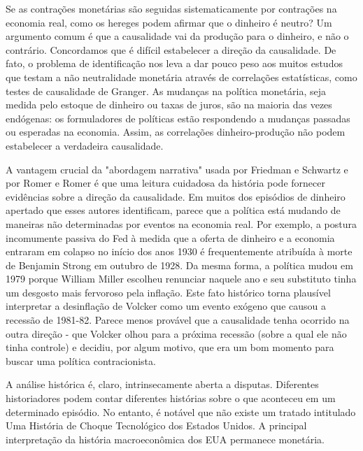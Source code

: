 \documentclass[a4paper,12pt]{article}[abntex2]
\begin{document}
Se as contrações monetárias são seguidas sistematicamente por contrações na economia real, como os hereges podem afirmar que o dinheiro é neutro? Um argumento comum é que a causalidade vai da produção para o dinheiro, e não o contrário. Concordamos que é difícil estabelecer a direção da causalidade. De fato, o problema de identificação nos leva a dar pouco peso aos muitos estudos que testam a não neutralidade monetária através de correlações estatísticas, como testes de causalidade de Granger. As mudanças na política monetária, seja medida pelo estoque de dinheiro ou taxas de juros, são na maioria das vezes endógenas: os formuladores de políticas estão respondendo a mudanças passadas ou esperadas na economia. Assim, as correlações dinheiro-produção não podem estabelecer a verdadeira causalidade.

A vantagem crucial da "abordagem narrativa" usada por Friedman e Schwartz e por Romer e Romer é que uma leitura cuidadosa da história pode fornecer evidências sobre a direção da causalidade. Em muitos dos episódios de dinheiro apertado que esses autores identificam, parece que a política está mudando de maneiras não determinadas por eventos na economia real. Por exemplo, a postura incomumente passiva do Fed à medida que a oferta de dinheiro e a economia entraram em colapso no início dos anos 1930 é frequentemente atribuída à morte de Benjamin Strong em outubro de 1928. Da mesma forma, a política mudou em 1979 porque William Miller escolheu renunciar naquele ano e seu substituto tinha um desgosto mais fervoroso pela inflação. Este fato histórico torna plausível interpretar a desinflação de Volcker como um evento exógeno que causou a recessão de 1981-82. Parece menos provável que a causalidade tenha ocorrido na outra direção - que Volcker olhou para a próxima recessão (sobre a qual ele não tinha controle) e decidiu, por algum motivo, que era um bom momento para buscar uma política contracionista.

A análise histórica é, claro, intrinsecamente aberta a disputas. Diferentes historiadores podem contar diferentes histórias sobre o que aconteceu em um determinado episódio. No entanto, é notável que não existe um tratado intitulado Uma História de Choque Tecnológico dos Estados Unidos. A principal interpretação da história macroeconômica dos EUA permanece monetária.
\end{document}

